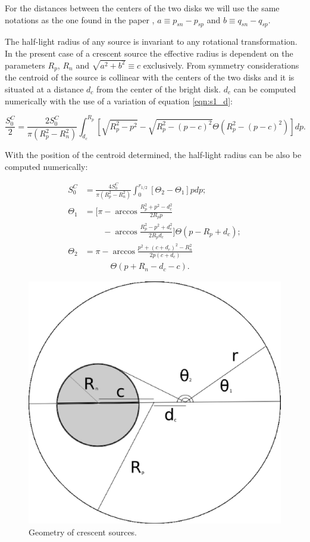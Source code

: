 For the distances between the centers of the two disks we will use the same notations as the one found in the paper \citep{2013MNRAS.434..765K}, $a \equiv p_{sn} - p_{sp}$ and $b \equiv q_{sn} - q_{sp}$.

The half-light radius of any source is invariant to any rotational transformation. In the present case of a crescent source the effective radius is dependent on the parameters $R_p$, $R_n$ and $\sqrt{a^2+b^2}\equiv c $ exclusively. From symmetry considerations the centroid of the source is collinear with the centers of the two disks and it is situated at a distance $d_c$ from the center of the bright disk. $d_c$ can be computed numerically with the use of a variation of equation \ref{eqn:s1_d}:

\begin{equation}
\frac{S_0^C}{2} =  \frac{2 S_0^C}{\pi \left(R_p^2-R_n^2 \right)} \int_{d_c}^{R_p} \left[ \sqrt{R_p^2 - p^2} - \sqrt{R_p^2 - \left(p-c\right)^2} \Theta \left(R_p^2 - \left(p-c\right)^2 \right) \right] dp.
\end{equation}   

With the position of the centroid determined, the half-light radius can be also be computed numerically:
 
\begin{equation}
\begin{aligned}
S_0^C &=  \frac{4S_0^C}{\pi \left(R_p^2-R_n^2 \right)} \int_{0}^{r_{1/2}} \left[ \Theta_2  - \Theta_1  \right] p dp; \\
\Theta_1 &= \bigg[ \pi - \arccos \frac{R_p^2 + p^2 -d_c^2}{2 R_p p} \\
         & \phantom{= \bigg[ \pi} - \arccos \frac{R_p^2 - p^2 + d_c^2}{2 R_p d_c}
            \bigg] \Theta \left( p - R_p + d_c \right); \\
\Theta_2 &=  \pi - \arccos \frac{ p^2  + (c+d_c)^2 - R_n^2}
                                {2 p \left(c + d_c \right)} \\
         & \phantom{= \pi - } \Theta \left( p + R_n - d_c -c \right). 
\end{aligned}
\end{equation}

\begin{figure}
\includegraphics[width = .49\textwidth]{plots/figure_rhalf.eps}
\caption{\label{fig:geom_crescent} Geometry of crescent sources.}
\end{figure}





